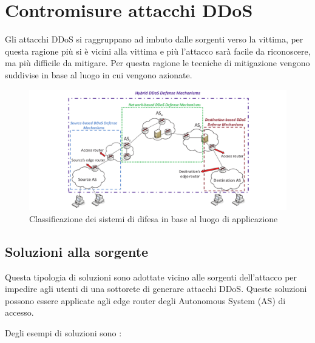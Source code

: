 \section{Contromisure attacchi DDoS}

Gli attacchi DDoS si raggruppano ad imbuto dalle sorgenti verso la vittima, per questa ragione più si è vicini alla vittima e più l'attacco sarà facile da riconoscere, ma più difficile da mitigare. Per questa ragione le tecniche di mitigazione vengono suddivise in base al luogo in cui vengono azionate.

\begin{figure}[]
    \label{fig:classificazione_ddos}
    \includegraphics[width=\hsize]{images/ddos/classificazione_difese.png}
    \caption{Classificazione dei sistemi di difesa in base al luogo di applicazione \cite{ddos_survey_1}}
    \centering
\end{figure}

\subsection{Soluzioni alla sorgente}
Questa tipologia di soluzioni sono adottate vicino alle sorgenti dell'attacco per impedire agli utenti di una sottorete di generare attacchi DDoS. Queste soluzioni possono essere applicate agli edge router degli Autonomous System (AS) di accesso.

Degli esempi di soluzioni sono \cite{ddos_survey_1}:

